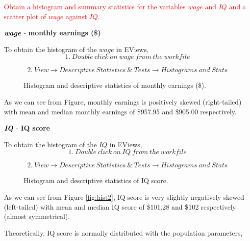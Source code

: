 \documentclass[12pt]{report}
\begin{document}
\noindent \textcolor{red}{Obtain a histogram and summary statistics for the variables $wage$ and $IQ$ and a scatter plot of $wage$ against $IQ$.}
\begin{center}
\noindent $\textbf{\textit{wage}}$ - \textbf{monthly earnings (\$)}
\end{center}
\noindent To obtain the histogram of the $wage$ in EViews,
$$1.\ Double\ click\ on\ wage\ from\ the\ workfile$$
\begin{figure}[H]
\centering
\end{figure}
\vspace{-\baselineskip}
$$2.\ View \to Descriptive\ Statistics\ \&\ Tests \to Histograms\ and\ Stats$$
\begin{figure}[H]
\centering
\end{figure}
\vspace{-\baselineskip}
\begin{figure}[H]
\caption{Histogram and descriptive statistics of monthly earnings (\$).}
\end{figure}
\vspace{-\baselineskip}
\noindent As we can see from Figure, monthly earnings is positively skewed (right-tailed) with mean and median monthly earnings of \$957.95 and \$905.00 respectively. \par
\begin{center}
$\textbf{\textit{IQ}}$ - \textbf{IQ score}
\end{center}
\noindent To obtain the histogram of the $IQ$ in EViews,
$$1.\ Double\ click\ on\ IQ\ from\ the\ workfile$$
\begin{figure}[H]
	\centering
\end{figure}
\vspace{-\baselineskip}
$$2.\ View \to Descriptive\ Statistics\ \&\ Tests \to Histograms\ and\ Stats$$
\begin{figure}[H]
	\centering
\end{figure}
\vspace{-\baselineskip}
\begin{figure}[H]
	\caption{Histogram and descriptive statistics of IQ score.}
\end{figure}
\vspace{-\baselineskip}
\noindent As we can see from Figure \ref{fig:hist2}, IQ score is very slightly negatively skewed (left-tailed) with mean and median IQ score of \$101.28 and \$102 respectively (almost symmetrical). \par
\noindent Theoretically, IQ score is normally distributed with the population parameters,
\end{document}
